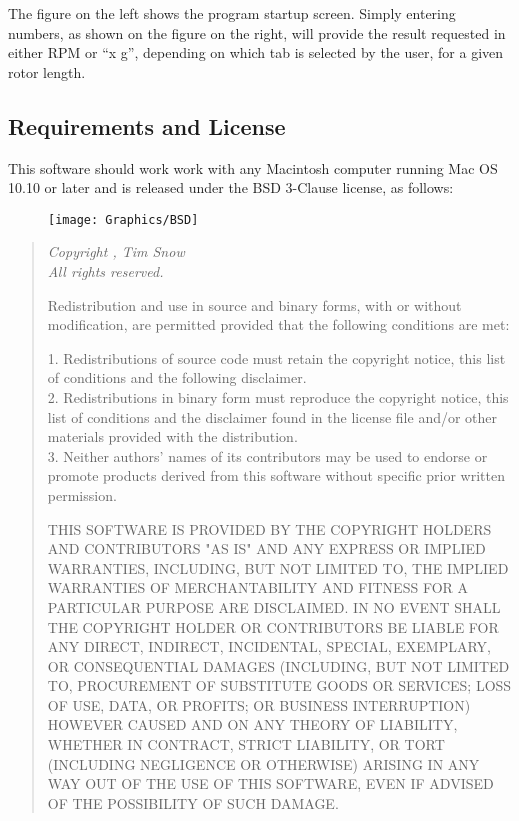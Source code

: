 \documentclass[a4paper]{article}
\begin{document}
		\noindent The figure on the left shows the program startup screen. Simply entering numbers, as shown on the figure on the right, will provide the result requested in either RPM or ``x g'', depending on which tab is selected by the user, for a given rotor length.

		\clearpage


	\begin{centering}
 		\section*{Requirements and License}
 		\label{sec:requirements_and_license}
	\end{centering} 
		
			\noindent This software should work work with any Macintosh computer running Mac OS 10.10 or later and is released under the BSD 3-Clause license, as follows:

			\begin{figure}[ht!]
				\centering
				\texttt{[image: Graphics/BSD]}
			\end{figure}

			\begin{quote}
				{\it
					Copyright , Tim Snow\\
					All rights reserved.

					Redistribution and use in source and binary forms, with or without modification, are permitted provided that the following conditions are met:

					1. Redistributions of source code must retain the copyright notice, this list of conditions and the following disclaimer.\\
					2. Redistributions in binary form must reproduce the copyright notice, this list of conditions and the disclaimer found in the license file and/or other materials provided with the distribution.\\
					3. Neither authors' names of its contributors may be used to endorse or promote products derived from this software without specific prior written permission.

					THIS SOFTWARE IS PROVIDED BY THE COPYRIGHT HOLDERS AND CONTRIBUTORS "AS IS" AND ANY EXPRESS OR IMPLIED WARRANTIES, INCLUDING, BUT NOT LIMITED TO, THE IMPLIED WARRANTIES OF MERCHANTABILITY AND FITNESS FOR A PARTICULAR PURPOSE ARE DISCLAIMED. IN NO EVENT SHALL THE COPYRIGHT HOLDER OR CONTRIBUTORS BE LIABLE FOR ANY DIRECT, INDIRECT, INCIDENTAL, SPECIAL, EXEMPLARY, OR CONSEQUENTIAL DAMAGES (INCLUDING, BUT NOT LIMITED TO, PROCUREMENT OF SUBSTITUTE GOODS OR SERVICES; LOSS OF USE, DATA, OR PROFITS; OR BUSINESS INTERRUPTION) HOWEVER CAUSED AND ON ANY THEORY OF LIABILITY, WHETHER IN CONTRACT, STRICT LIABILITY, OR TORT (INCLUDING NEGLIGENCE OR OTHERWISE) ARISING IN ANY WAY OUT OF THE USE OF THIS SOFTWARE, EVEN IF ADVISED OF THE POSSIBILITY OF SUCH DAMAGE.
				}
			\end{quote}
\end{document}
